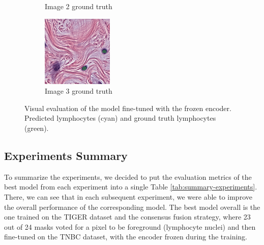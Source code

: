 \begin{figure}[H]
\begin{subfigure}[b]{0.32\textwidth}
    \caption{Image 2 ground truth}
  \end{subfigure}\hfill
  \begin{subfigure}[b]{0.32\textwidth}
    \centering
    \includegraphics[width=\linewidth]{assets/images/for_presentation/exp4-3-gt.png}
    \caption{Image 3 ground truth}
  \end{subfigure}
  \caption{Visual evaluation of the model fine-tuned with the frozen encoder. Predicted lymphocytes (cyan) and ground truth lymphocytes (green).}
  \label{fig:exp4-results}
\end{figure}

\subsection{Experiments Summary}
To summarize the experiments, we decided to put the evaluation metrics of the best model from each experiment into a single Table \ref{tab:summary-experiments}. There, we can see that in each subsequent experiment, we were able to improve the overall performance of the corresponding model. The best model overall is the one trained on the TIGER dataset and the consensus fusion strategy, where 23 out of 24 masks voted for a pixel to be foreground (lymphocyte nuclei) and then fine-tuned on the TNBC dataset, with the encoder frozen during the training.

